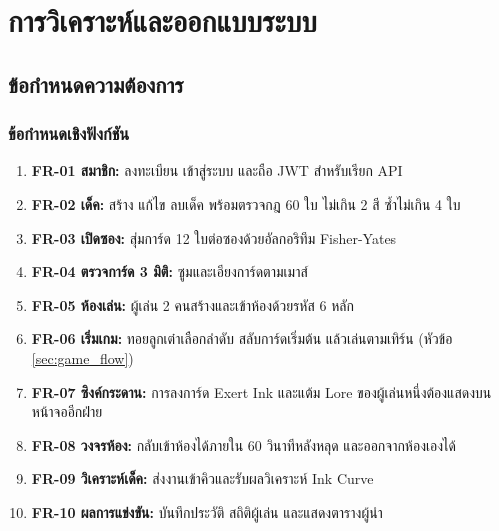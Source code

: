 \chapter{การวิเคราะห์และออกแบบระบบ}

\section{ข้อกำหนดความต้องการ}

\subsection{ข้อกำหนดเชิงฟังก์ชัน}
\begin{enumerate}
    \item \textbf{FR-01 สมาชิก:} ลงทะเบียน เข้าสู่ระบบ และถือ JWT สำหรับเรียก API
    \item \textbf{FR-02 เด็ค:} สร้าง แก้ไข ลบเด็ค พร้อมตรวจกฎ 60 ใบ ไม่เกิน 2 สี ซ้ำไม่เกิน 4 ใบ
    \item \textbf{FR-03 เปิดซอง:} สุ่มการ์ด 12 ใบต่อซองด้วยอัลกอริทึม Fisher-Yates
    \item \textbf{FR-04 ตรวจการ์ด 3 มิติ:} ซูมและเอียงการ์ดตามเมาส์
    \item \textbf{FR-05 ห้องเล่น:} ผู้เล่น 2 คนสร้างและเข้าห้องด้วยรหัส 6 หลัก
    \item \textbf{FR-06 เริ่มเกม:} ทอยลูกเต๋าเลือกลำดับ สลับการ์ดเริ่มต้น แล้วเล่นตามเทิร์น (หัวข้อ \ref{sec:game_flow})
    \item \textbf{FR-07 ซิงค์กระดาน:} การลงการ์ด Exert Ink และแต้ม Lore ของผู้เล่นหนึ่งต้องแสดงบนหน้าจออีกฝ่าย
    \item \textbf{FR-08 วงจรห้อง:} กลับเข้าห้องได้ภายใน 60 วินาทีหลังหลุด และออกจากห้องเองได้
    \item \textbf{FR-09 วิเคราะห์เด็ค:} ส่งงานเข้าคิวและรับผลวิเคราะห์ Ink Curve
    \item \textbf{FR-10 ผลการแข่งขัน:} บันทึกประวัติ สถิติผู้เล่น และแสดงตารางผู้นำ
\end{enumerate}

